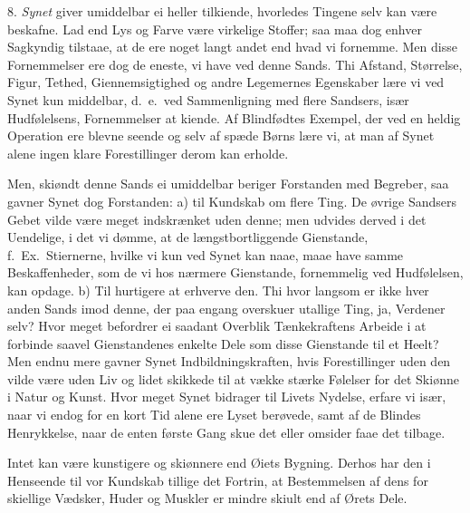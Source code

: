 \documentclass[12pt,a4paper]{article}
\newcommand{\opage}[1]{\marginnote{\footnotesize\textit{[#1]}}}
\begin{document}
8. \emph{Synet} giver umiddelbar ei heller tilkiende, hvorledes Tingene selv kan være
beskafne. Lad end Lys og Farve være virkelige Stoffer; saa maa dog enhver Sagkyndig
tilstaae, at de ere noget langt andet end hvad vi fornemme. Men disse Fornemmelser ere
dog de eneste, vi have ved denne Sands. Thi Afstand, Størrelse, Figur, Tethed,
Giennemsigtighed og andre Legemernes Egenskaber lære vi ved Synet kun middelbar,
d.~e.\ ved Sammenligning med flere Sandsers, især Hudfølelsens, Fornemmelser at
kiende. Af Blindfødtes Exempel, der ved en heldig Operation ere blevne
\opage{72} seende og selv af spæde Børns lære vi, at man af Synet alene ingen klare Forestillinger
derom kan erholde.

Men, skiøndt denne Sands ei umiddelbar beriger Forstanden med Begreber, saa gavner
Synet dog Forstanden: a) til Kundskab om flere Ting. De øvrige Sandsers Gebet vilde
være meget indskrænket uden denne; men udvides derved i det Uendelige, i det vi dømme,
at de længstbortliggende Gienstande, f.~Ex.\ Stiernerne, hvilke vi kun ved Synet kan
naae, maae have samme Beskaffenheder, som de vi hos nærmere Gienstande, fornemmelig ved
Hudfølelsen, kan opdage. b) Til hurtigere at erhverve den. Thi hvor langsom er ikke
hver anden Sands imod denne, der paa engang overskuer utallige Ting, ja, Verdener selv?
Hvor meget befordrer ei saadant Overblik Tænkekraftens Arbeide i at forbinde saavel
Gienstandenes enkelte Dele som disse Gienstande til et Heelt? Men endnu mere gavner
Synet Indbildningskraften, hvis Forestillinger uden den vilde være uden Liv og lidet
skikkede til at vække stærke Følelser for det Skiønne i Natur og Kunst. Hvor meget
Synet bidrager til Livets Nydelse, erfare vi især, naar vi endog for en kort Tid alene
ere Lyset berøvede, samt af de Blindes Henrykkelse, naar de enten første Gang skue det
eller omsider faae det tilbage.

Intet kan være kunstigere og skiønnere end Øiets Bygning. Derhos har den i Henseende
til vor Kundskab tillige det Fortrin, at Bestemmelsen af dens for%
\opage{73}skiellige Vædsker, Huder og Muskler er mindre skiult end af Ørets Dele.
\end{document}
